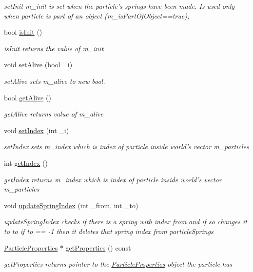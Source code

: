 \begin{DoxyCompactItemize}
\begin{DoxyCompactList}\small\item\em set\-Init m\-\_\-init is set when the particle's springs have been made. Is used only when particle is part of an object (m\-\_\-is\-Part\-Of\-Object==true); \end{DoxyCompactList}\item 
bool \hyperlink{classParticle_ae1b9331af6c436952ebe3a748703355b}{is\-Init} ()
\begin{DoxyCompactList}\small\item\em is\-Init returns the value of m\-\_\-init \end{DoxyCompactList}\item 
void \hyperlink{classParticle_ae84d5233185dda1df8d92b31988c5790}{set\-Alive} (bool \-\_\-i)
\begin{DoxyCompactList}\small\item\em set\-Alive sets m\-\_\-alive to new bool. \end{DoxyCompactList}\item 
bool \hyperlink{classParticle_aca953a26773ae228530de02c2becf6d7}{get\-Alive} ()
\begin{DoxyCompactList}\small\item\em get\-Alive returns value of m\-\_\-alive \end{DoxyCompactList}\item 
void \hyperlink{classParticle_a984ce8220a48ee851bfaa443cc98ae96}{set\-Index} (int \-\_\-i)
\begin{DoxyCompactList}\small\item\em set\-Index sets m\-\_\-index which is index of particle inside world's vector m\-\_\-particles \end{DoxyCompactList}\item 
int \hyperlink{classParticle_a0cb31e8c8a445894f2f5b68b148135d2}{get\-Index} ()
\begin{DoxyCompactList}\small\item\em get\-Index returns m\-\_\-index which is index of particle inside world's vector m\-\_\-particles \end{DoxyCompactList}\item 
void \hyperlink{classParticle_ae82fd88a76aa1c0aaa6c6d2149401ed2}{update\-Spring\-Index} (int \-\_\-from, int \-\_\-to)
\begin{DoxyCompactList}\small\item\em update\-Spring\-Index checks if there is a spring with index from and if so changes it to to if to == -\/1 then it deletes that spring index from particle\-Springs \end{DoxyCompactList}\item 
\hyperlink{classParticleProperties}{Particle\-Properties} $\ast$ \hyperlink{classParticle_aa8d3d0b59174d90b174497a2b0eecf53}{get\-Properties} () const 
\begin{DoxyCompactList}\small\item\em get\-Properties returns pointer to the \hyperlink{classParticleProperties}{Particle\-Properties} object the particle has \end{DoxyCompactList}\end{DoxyCompactItemize}
